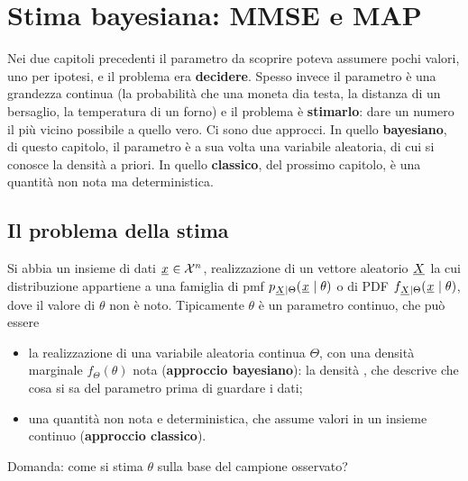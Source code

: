 \chapter{Stima bayesiana: MMSE e MAP}

Nei due capitoli precedenti il parametro da scoprire poteva assumere pochi valori, uno per ipotesi, e il problema era
\textbf{decidere}. Spesso invece il parametro è una grandezza continua (la probabilità che una moneta dia testa, la
distanza di un bersaglio, la temperatura di un forno) e il problema è \textbf{stimarlo}: dare un numero il più vicino
possibile a quello vero. Ci sono due approcci. In quello \textbf{bayesiano}, di questo capitolo, il parametro è a sua
volta una variabile aleatoria, di cui si conosce la densità a priori. In quello \textbf{classico}, del prossimo
capitolo, è una quantità non nota ma deterministica.

\section{Il problema della stima}

Si abbia un insieme di dati ${\mkern1mu\underline{x}\mkern1mu} \in \mathcal{X}^n$, realizzazione di un vettore aleatorio ${\mkern1mu\underline{X}\mkern1mu}$ la cui
distribuzione appartiene a una famiglia di pmf $p_{{\mkern1mu\underline{X}\mkern1mu} \mid \Theta}({\mkern1mu\underline{x}\mkern1mu} \mid \theta)$ o di PDF
$f_{{\mkern1mu\underline{X}\mkern1mu} \mid \Theta}({\mkern1mu\underline{x}\mkern1mu} \mid \theta)$, dove il valore di $\theta$ non è noto. Tipicamente $\theta$ è un
parametro continuo, che può essere
\begin{itemize}
  \item la realizzazione di una variabile aleatoria continua $\Theta$, con una densità marginale $f_\Theta(\theta)$ nota
        (\textbf{approccio bayesiano}): la densità , che descrive che cosa si sa del parametro prima di
        guardare i dati;
  \item una quantità non nota e deterministica, che assume valori in un insieme continuo (\textbf{approccio classico}).
\end{itemize}
Domanda: come si stima $\theta$ sulla base del campione osservato?

